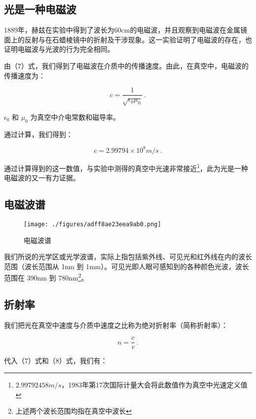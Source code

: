 \subsection{光是一种电磁波}

1889年，赫兹在实验中得到了波长为60cm的电磁波，并且观察到电磁波在金属镜面上的反射与在石蜡棱镜中的折射及干涉现象。这一实验证明了电磁波的存在，也证明电磁波与光波的行为完全相同。

由（7）式，我们得到了电磁波在介质中的传播速度。由此，在真空中，电磁波的传播速度为：

\begin{equation}
c = \frac{1}{\sqrt{\epsilon_0 \mu_0}} ~.
\end{equation}

$\epsilon_0$ 和 $\mu_0$ 为真空中介电常数和磁导率。

通过计算，我们得到：

\begin{equation}
c = 2.99794 \times 10^8 m/s~.
\end{equation}

通过计算得到的这一数值，与实验中测得的真空中光速非常接近\footnote{$2.99792458m/s$，1983年第17次国际计量大会将此数值作为真空中光速定义值}，此为光是一种电磁波的又一有力证据。

\subsection{电磁波谱}

\begin{figure}[ht]
\centering
\texttt{[image: ./figures/adff8ae23eea9ab0.png]}
\caption{电磁波谱} \label{fig_WaOp1_1}
\end{figure}

我们所说的光学区或光学波谱，实际上指包括紫外线、可见光和红外线在内的波长范围（波长范围从 1nm 到 1mm）。可见光即人眼可感知到的各种颜色光波，波长范围在 390nm 到 780nm\footnote{上述两个波长范围均指在真空中波长}。

\subsection{折射率}

我们把光在真空中速度与介质中速度之比称为绝对折射率（简称折射率）：

\begin{equation}
n = \frac{c}{v} ~.
\end{equation}

代入（7）式和（8）式，我们有：


